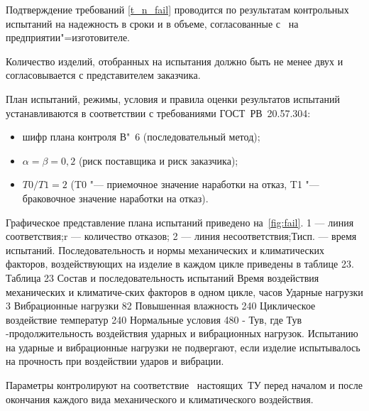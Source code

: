 Подтверждение требований \ref{t_n_fail} проводится по результатам контрольных испытаний на надежность в сроки и в объеме, согласованные с \client \ на предприятии"=изготовителе.

Количество изделий, отобранных на испытания должно быть не менее двух и согласовывается с представителем заказчика.

План испытаний, режимы, условия и правила оценки результатов испытаний устанавливаются в соответствии с требованиями ГОСТ~РВ~20.57.304:

\begin{itemize}
	\item шифр плана контроля В"~6 (последовательный метод);
	\item $\alpha = \beta = 0,2$ (риск поставщика и риск заказчика);
	\item $T0/T1 = 2$ (T0 "--- приемочное значение наработки на отказ, T1 "--- браковочное значение наработки на отказ).
\end{itemize}

Графическое представление плана испытаний приведено на~\ref{fig:fail}.
1 --- линия соответствия;r --- количество отказов;
2 --- линия несоответствия;Тисп. --- время испытаний.
Последовательность и нормы механических и климатических факторов, воздействующих на изделие в каждом цикле приведены в таблице 23.
Таблица 23
Состав и последовательность испытаний	Время воздействия механических и климатиче-ских факторов в одном цикле, часов
Ударные нагрузки	3 
Вибрационные нагрузки	82
Повышенная влажность	240
Циклическое воздействие температур	240
Нормальные условия	480 - Тув,
 где Тув -продолжительность воздействия ударных и вибрационных нагрузок.
Испытанию на ударные и вибрационные нагрузки не подвергают, если изделие испытывалось на прочность при воздействии ударов и вибрации.

Параметры контролируют на соответствие \treb \ настоящих~ТУ перед началом и после окончания каждого вида механического и климатического воздействия.
